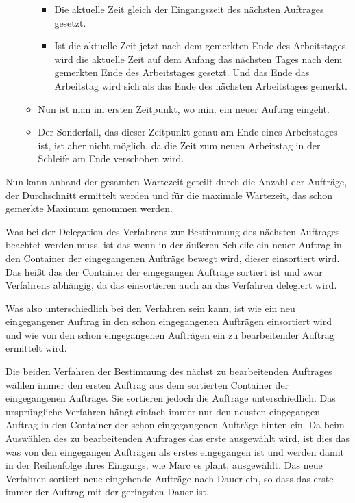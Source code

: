 \documentclass[a4paper,10pt,ngerman]{scrartcl}
\begin{document}
\begin{itemize}
\begin{itemize}
\begin{itemize}
			            \item Die aktuelle Zeit gleich der Eingangszeit des nächsten Auftrages gesetzt.
			            \item Ist die aktuelle Zeit jetzt nach dem gemerkten Ende des Arbeitstages,
			                  wird die aktuelle Zeit auf dem Anfang das nächsten Tages nach dem gemerkten Ende des Arbeitstages gesetzt.
			                  Und das Ende das Arbeitstag wird sich als das Ende des nächsten Arbeitstages gemerkt.
		            \end{itemize}
		      \item Nun ist man im ersten Zeitpunkt, wo min. ein neuer Auftrag eingeht.
		      \item Der Sonderfall, das dieser Zeitpunkt genau am Ende eines Arbeitstages ist,
		            ist aber nicht möglich, da die Zeit zum neuen Arbeitstag in der Schleife am Ende verschoben wird.
	      \end{itemize}
\end{itemize}
Nun kann anhand der gesamten Wartezeit geteilt durch die Anzahl der Aufträge, der Durchschnitt ermittelt werden
und für die maximale Wartezeit, das schon gemerkte Maximum genommen werden.

Was bei der Delegation des Verfahrens zur Bestimmung des nächsten Auftrages beachtet werden muss,
ist das wenn in der äußeren Schleife ein neuer Auftrag in den Container der eingegangenen Aufträge bewegt wird,
dieser einsortiert wird. Das heißt das der Container der eingegangen Aufträge sortiert ist und zwar Verfahrens abhängig,
da das einsortieren auch an das Verfahren delegiert wird.

Was also unterschiedlich bei den Verfahren sein kann, ist wie ein neu eingegangener Auftrag
in den schon eingegangenen Aufträgen einsortiert wird
und wie von den schon eingegangenen Aufträgen ein zu bearbeitender Auftrag ermittelt wird.

Die beiden Verfahren der Bestimmung des nächst zu bearbeitenden Auftrages wählen immer den ersten Auftrag
aus dem sortierten Container der eingegangenen Aufträge. Sie sortieren jedoch die Aufträge unterschiedlich.
Das ursprüngliche Verfahren hängt einfach immer nur den neusten eingegangen Auftrag
in den Container der schon eingegangenen Aufträge hinten ein.
Da beim Auswählen des zu bearbeitenden Auftrages das erste ausgewählt wird,
ist dies das was von den eingegangen Aufträgen als erstes eingegangen ist
und werden damit in der Reihenfolge ihres Eingangs, wie Marc es plant, ausgewählt.
Das neue Verfahren sortiert neue eingehende Aufträge nach Dauer ein,
so dass das erste immer der Auftrag mit der geringsten Dauer ist.
\end{document}
